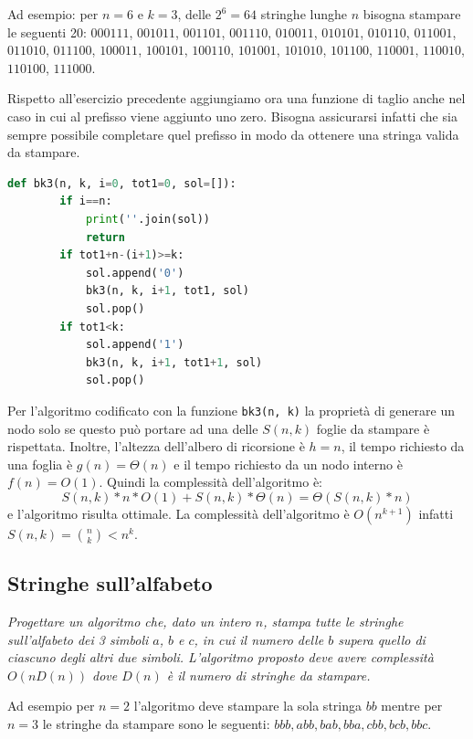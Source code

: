 Ad esempio: per $n=6$ e $k=3$, delle $2^6=64$ stringhe lunghe $n$ bisogna stampare le seguenti 20: $000111$, $001011$, $001101$, $001110$, $010011$, $010101$, $010110$, $011001$, $011010$, $011100$, $100011$, $100101$, $100110$, $101001$, $101010$, $101100$, $110001$, $110010$, $110100$, $111000$.

Rispetto all'esercizio precedente aggiungiamo ora una funzione di taglio anche nel caso in cui al prefisso viene aggiunto uno zero. Bisogna assicurarsi infatti che sia sempre possibile completare quel prefisso in modo da ottenere una stringa valida da stampare.

\begin{lstlisting}[language=Python]
    def bk3(n, k, i=0, tot1=0, sol=[]):
        if i==n:
            print(''.join(sol))
            return
        if tot1+n-(i+1)>=k:
            sol.append('0')
            bk3(n, k, i+1, tot1, sol)
            sol.pop()
        if tot1<k:
            sol.append('1')
            bk3(n, k, i+1, tot1+1, sol)
            sol.pop()
\end{lstlisting}
Per l'algoritmo codificato con la funzione \verb|bk3(n, k)| la proprietà di generare un nodo solo se questo può portare ad una delle $S(n, k)$ foglie da stampare è rispettata.
Inoltre, l'altezza dell'albero di ricorsione è $h = n$, il tempo richiesto da una foglia è $g(n) = \Theta(n)$ e il tempo richiesto da un nodo interno è $f(n) = O(1)$. Quindi la complessità dell'algoritmo è: 
\begin{equation*}
    S(n, k) * n*O(1) + S(n, k) * \Theta(n) = \Theta(S(n, k) * n)    
\end{equation*}
e l'algoritmo risulta ottimale.
La complessità dell'algoritmo è $O(n ^{k + 1})$ infatti $S(n, k) = \binom{n}{k}< n ^ k$.

\subsection{Stringhe sull'alfabeto}
\textit{Progettare un algoritmo che, dato un intero $n$, stampa tutte le stringhe sull’alfabeto dei 3 simboli $a$, $b$ e $c$, in cui il numero delle $b$ supera quello di ciascuno degli altri due simboli. L’algoritmo proposto deve avere complessità $O(nD(n))$ dove $D(n)$ è il numero di stringhe da stampare.}

Ad esempio per $n = 2$ l’algoritmo deve stampare la sola stringa $bb$ mentre per $n = 3$ le stringhe da stampare sono le seguenti: $bbb, abb, bab, bba, cbb, bcb, bbc$.

